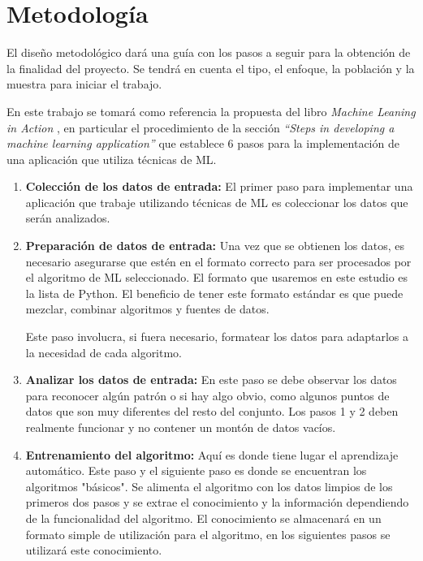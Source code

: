 \section{Metodología}
El diseño metodológico dará una guía con los pasos a seguir para la obtención de la finalidad del proyecto. Se tendrá en cuenta el tipo, el enfoque, la población y la muestra para iniciar el trabajo.\\
\par En este trabajo se tomará como referencia la propuesta del libro \emph{Machine Leaning in Action} \cite{Harrington2012}, en particular el procedimiento de la sección \emph{“Steps in developing a machine learning application”} que establece 6 pasos para la implementación de una aplicación que utiliza técnicas de ML. \\
\begin{enumerate}
	\item \textbf{Colección de los datos de entrada:} El primer paso para implementar una aplicación que trabaje utilizando técnicas de ML es coleccionar los datos que serán analizados. 
	\item \textbf{Preparación de datos de entrada:} Una vez que se obtienen los datos, es necesario asegurarse que estén en el formato correcto para ser procesados por el algoritmo de ML seleccionado. El formato que usaremos en este estudio es la lista de Python. El beneficio de tener este formato estándar es que puede mezclar, combinar algoritmos y fuentes de datos.
\par Este paso involucra, si fuera necesario, formatear los datos para adaptarlos a la necesidad de cada algoritmo.

	\item \textbf{Analizar los datos de entrada:} En este paso se debe observar los datos para reconocer algún patrón 	o si hay algo obvio, como algunos puntos de datos que son muy diferentes del resto del conjunto. Los pasos 1 y 2 deben realmente funcionar y no contener un montón de datos vacíos. 

	\item \textbf{Entrenamiento del algoritmo:} Aquí es donde tiene lugar el aprendizaje automático. Este paso y el siguiente paso es donde se encuentran los algoritmos "básicos". Se alimenta el algoritmo con los datos limpios de los primeros dos pasos y se extrae el conocimiento y la información dependiendo de la funcionalidad del algoritmo. El conocimiento se almacenará en un formato simple de utilización para el algoritmo, en los siguientes pasos se utilizará este conocimiento.


\end{enumerate}
